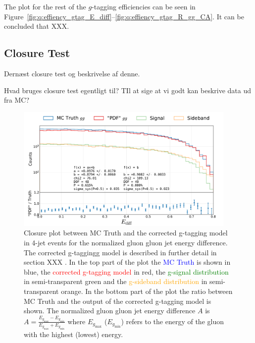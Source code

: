 The plot for the rest of the $g$-tagging efficiencies can be seen in Figure~\ref{fig:q:effiency_gtag_E_diff}--\ref{fig:q:effiency_gtag_R_gg_CA}. It can be concluded that XXX. 

\subsection{Closure Test}
\label{subsec:q:gluon_splitting_closure}

Dernæst closure test og beskrivelse af denne. 

Hvad bruges closure test egentligt til? TIl at sige at vi godt kan beskrive data ud fra MC?


\begin{figure}
  \centerfloat
  \includegraphics[width=0.95\textwidth, trim=0 0 0 65, clip, page=1]{figures/quarks/gtag-closure_test-down_sample=1.00-ML_vars=vertex-selection=b-ejet_min=4-n_iter_RS_lgb=99-n_iter_RS_xgb=9-cdot_cut=0.90-version=19-njet=3.pdf}
  \caption[Closure plot between MC Truth and the corrected g-tagging model in 4-jet events for the normalized gluon gluon jet energy difference]
          {Closure plot between MC Truth and the corrected g-tagging model in 4-jet events for the normalized gluon gluon jet energy difference. The corrected g-taggingg model is described in further detail in section XXX \TODO. In the top part of the plot the \textcolor{blue}{MC Truth} is shown in blue, the \textcolor{red}{corrected g-tagging model}  in red, the \textcolor{green}{g-signal distribution} in semi-transparent green and the \textcolor{orange}{g-sideband distribution} in semi-transparent orange. In the bottom part of the plot the ratio between MC Truth and the output of the corrected g-tagging model is shown. The normalized gluon gluon jet energy difference $A$ is $A=\frac{E_{g_\mathrm{max}}-E_{g_\mathrm{min}}}{E_{g_\mathrm{max}}+E_{g_\mathrm{min}}}$ where $E_{g_\mathrm{max}}$ ($E_{g_\mathrm{min}}$) refers to the energy of the gluon with the highest (lowest) energy.
          } 
  \label{fig:q:closure_E_diff}
\end{figure}

